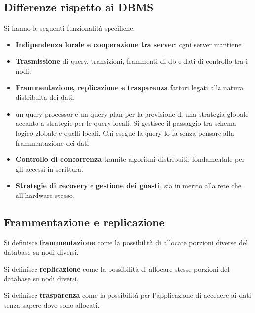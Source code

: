 \subsection{Differenze rispetto ai DBMS}
Si hanno le seguenti funzionalità specifiche:
\begin{itemize}
    \item \textbf{Indipendenza locale e cooperazione tra server}: ogni server 
    mantiene 
    \item \textbf{Trasmissione} di query, transizioni, frammenti di db e dati
          di controllo tra i nodi.
    \item \textbf{Frammentazione, replicazione e trasparenza} fattori legati
          alla natura distribuita dei dati.
    \item un query processor e un query plan per la previsione di una
          strategia globale accanto a strategie per le query locali. Si gestisce
          il passaggio tra schema logico globale e quelli locali. Chi esegue
          la query lo fa senza pensare alla frammentazione dei dati
    \item \textbf{Controllo di concorrenza} tramite algoritmi distribuiti, fondamentale
          per gli accessi in scrittura.
    \item \textbf{Strategie di recovery} e \textbf{gestione dei guasti}, sia
          in merito alla rete che all'hardware stesso.
\end{itemize}

\subsection{Frammentazione e replicazione}
\begin{definizione}
    Si definisce \textbf{frammentazione} come la possibilità di allocare porzioni
    diverse del database su nodi diversi.
\end{definizione}
\begin{definizione}
    Si definisce \textbf{replicazione} come la possibilità di allocare stesse
    porzioni del database su nodi diversi.
\end{definizione}
\begin{definizione}
    Si definisce \textbf{trasparenza} come la possibilità per l'applicazione di
    accedere ai dati senza sapere dove sono allocati.
\end{definizione}
